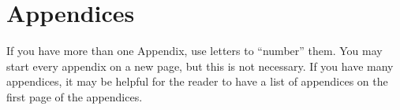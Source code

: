 
\section{Appendices}\label{ap:appendices}
If you have more than one Appendix, use letters to ``number'' them.
You may start every appendix on a new page, but this is not necessary.
If you have many appendices, it may be helpful for the reader to have a list of appendices on the first page of the appendices.
